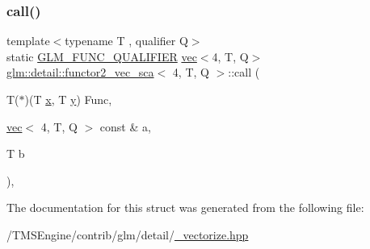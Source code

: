 \subsubsection{\texorpdfstring{call()}{call()}}
{\footnotesize\ttfamily template$<$typename T , qualifier Q$>$ \\
static \hyperlink{setup_8hpp_a33fdea6f91c5f834105f7415e2a64407}{G\+L\+M\+\_\+\+F\+U\+N\+C\+\_\+\+Q\+U\+A\+L\+I\+F\+I\+ER} \hyperlink{structglm_1_1vec}{vec}$<$4, T, Q$>$ \hyperlink{structglm_1_1detail_1_1functor2__vec__sca}{glm\+::detail\+::functor2\+\_\+vec\+\_\+sca}$<$ 4, T, Q $>$\+::call (\begin{DoxyParamCaption}\item[{T($\ast$)(T \hyperlink{_s_d_l__opengl_8h_ad0e63d0edcdbd3d79554076bf309fd47}{x}, T \hyperlink{_s_d_l__opengl_8h_a1675d9d7bb68e1657ff028643b4037e3}{y})}]{Func,  }\item[{\hyperlink{structglm_1_1vec}{vec}$<$ 4, T, Q $>$ const \&}]{a,  }\item[{T}]{b }\end{DoxyParamCaption})\hspace{0.3cm}{\ttfamily [inline]}, {\ttfamily [static]}}



The documentation for this struct was generated from the following file\+:\begin{DoxyCompactItemize}
\item 
/\+T\+M\+S\+Engine/contrib/glm/detail/\hyperlink{__vectorize_8hpp}{\+\_\+vectorize.\+hpp}\end{DoxyCompactItemize}
